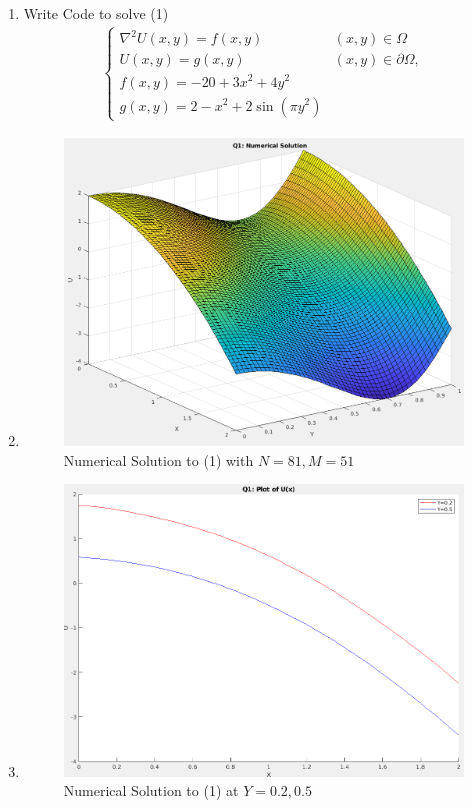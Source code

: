 \documentclass{article}
\begin{document}
\begin{enumerate}[label=\alph*)]

    \item Write Code to solve (1)
    \begin{align}
        \begin{cases}
            \nabla^2 U(x,y) = f(x,y) \quad &(x, y) \in \Omega\\
            U(x,y) = g(x,y) \quad &(x,y) \in \partial\Omega,\\
            f(x,y) = -20 +3x^2 + 4y^2\\
            g(x,y) = 2 - x^2 + 2\sin(\pi y^2)
        \end{cases} 
    \end{align}

    \item 
    \begin{figure}[ht]
        \centering
        \includegraphics[width=.6\textwidth]{q1_num_sol.png}
        \caption{Numerical Solution to (1) with $N=81, M=51$}
    \end{figure}

    \item 
    \begin{figure}[ht]
        \centering
        \includegraphics[width=.6\textwidth]{q1_num_sol_yconst.png}
        \caption{Numerical Solution to (1) at $Y=0.2, 0.5$}
    \end{figure}

\end{enumerate}
\end{document}
